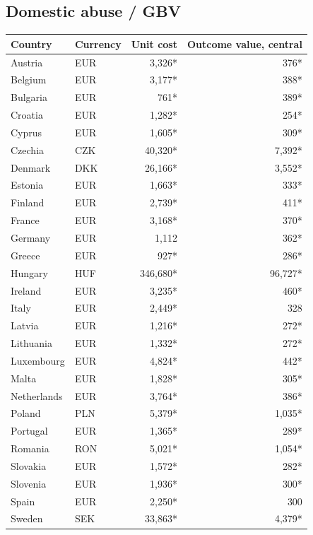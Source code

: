 \subsection*{Domestic abuse / GBV}
\begin{longtable}{llrr}
\toprule
Country & Currency & Unit cost & Outcome value, central \\
\midrule
\endhead
Austria & EUR & 3,326* & 376* \\
Belgium & EUR & 3,177* & 388* \\
Bulgaria & EUR & 761* & 389* \\
Croatia & EUR & 1,282* & 254* \\
Cyprus & EUR & 1,605* & 309* \\
Czechia & CZK & 40,320* & 7,392* \\
Denmark & DKK & 26,166* & 3,552* \\
Estonia & EUR & 1,663* & 333* \\
Finland & EUR & 2,739* & 411* \\
France & EUR & 3,168* & 370* \\
Germany & EUR & 1,112 & 362* \\
Greece & EUR & 927* & 286* \\
Hungary & HUF & 346,680* & 96,727* \\
Ireland & EUR & 3,235* & 460* \\
Italy & EUR & 2,449* & 328 \\
Latvia & EUR & 1,216* & 272* \\
Lithuania & EUR & 1,332* & 272* \\
Luxembourg & EUR & 4,824* & 442* \\
Malta & EUR & 1,828* & 305* \\
Netherlands & EUR & 3,764* & 386* \\
Poland & PLN & 5,379* & 1,035* \\
Portugal & EUR & 1,365* & 289* \\
Romania & RON & 5,021* & 1,054* \\
Slovakia & EUR & 1,572* & 282* \\
Slovenia & EUR & 1,936* & 300* \\
Spain & EUR & 2,250* & 300 \\
Sweden & SEK & 33,863* & 4,379* \\
\bottomrule
\end{longtable}
